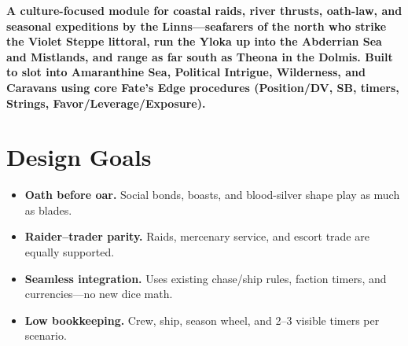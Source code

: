 \documentclass[11pt]{article}
\begin{document}




\begin{center}
\textbf{A culture-focused module for coastal raids, river thrusts, oath-law, and seasonal expeditions by the Linns---seafarers of the north who strike the Violet Steppe littoral, run the Yloka up into the Abderrian Sea and Mistlands, and range as far south as Theona in the Dolmis. Built to slot into Amaranthine Sea, Political Intrigue, Wilderness, and Caravans using core Fate's Edge procedures (Position/DV, SB, timers, Strings, Favor/Leverage/Exposure).}
\end{center}

\section*{Design Goals}
\begin{itemize}
\item \textbf{Oath before oar.} Social bonds, boasts, and blood-silver shape play as much as blades.
\item \textbf{Raider--trader parity.} Raids, mercenary service, and escort trade are equally supported.
\item \textbf{Seamless integration.} Uses existing chase/ship rules, faction timers, and currencies---no new dice math.
\item \textbf{Low bookkeeping.} Crew, ship, season wheel, and 2--3 visible timers per scenario.
\end{itemize}
\end{document}
